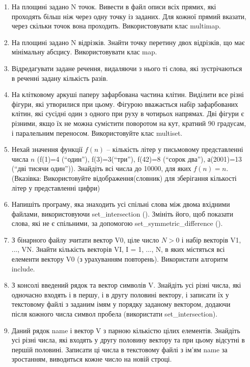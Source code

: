 \documentclass[]{article}
\begin{document}
\begin{enumerate}
\item
  На площині задано N точок. Вивести в файл описи всіх прямих, які
  проходять більш ніж через одну точку із заданих. Для кожної прямий
  вказати, через скільки точок вона проходить. Використовувати клас
  multimap.
\item
  На площині задано N відрізків. Знайти точку перетину двох відрізків,
  що має мінімальну абсцису. Використовувати клас map.
\item
  Відредагувати задане речення, видаляючи з нього ті слова, які
  зустрічаються в реченні задану кількість разів.
\item
  На клітковому аркуші паперу зафарбована частина клітин. Виділити все
  різні фігури, які утворилися при цьому. Фігурою вважається набір
  зафарбованих клітин, які сусідні один з одного при руху в чотирьох
  напрямах. Дві фігури є різними, якщо їх не можна сумістити поворотом
  на кут, кратний 90 градусам, і паралельним переносом. Використовуйте
  клас multiset.
\item
  Нехай значення функції \(f(n)\) -- кількість літер у письмовому
  представленні числа \(n\) (f(1)=4 (``один''), f(3)=3(``три''), f(42)=8
  (``сорок два''), а(2001)=13 (``дві тисячи один'')). Знайдіть всі числа
  до 10000, для яких \(f(n) = n\). (Вказівка: Використовуйте
  відображення(словник) для зберігання кількості літер у представленні
  цифри)
\item
  Напишіть програму, яка знаходить усі спільні слова між двома вхідними
  файлами, використовуючи set\_intersection (). Змініть його, щоб
  показати слова, які не є спільними, за допомогою
  set\_symmetric\_difference ().
\item
  З бінарного файлу зчитати вектор V0, ціле число \(N > 0\) і набір
  векторів V1, ..., VN. Знайти кількість векторів VI, I = 1, ..., N, в
  яких містяться всі елементи вектору V0 (з урахуванням повторень).
  Використати алгоритм include.
\item
  З консолі введений рядок та вектор символів V. Знайдіть усі різні
  числа, які одночасно входять і в першу, і в другу половині вектору, і
  записати їх у текстовому файлі з заданим імям у порядку заданому
  вектором, додаючи після кожного числа символ пробела (використати
  set\_intersection).
\item
  Даний рядок name і вектор V з парною кількістю цілих елементів.
  Знайдіть усі різні числа, які входять у другу половину вектору та при
  цьому відсутні в першій половині. Записати ці числа в текстовому файлі
  з ім'ям name за зростанням, виводиться кожне число на новій строці.

\end{enumerate}
\end{document}
